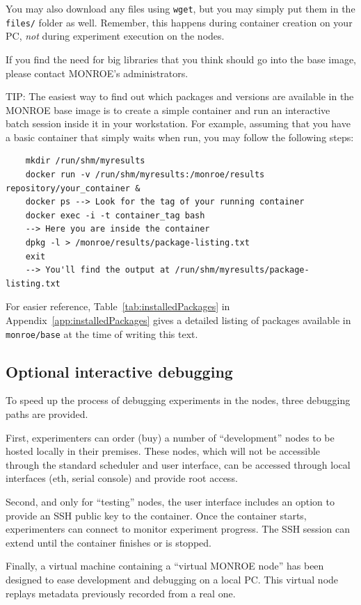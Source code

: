 \documentclass[a4paper,10pt]{article}
\newcommand{\VerbatimFont}{\footnotesize}
\newcommand{\monroe}{MONROE}
\newcommand{\identifier}[1]{{\texttt{\small{#1}}}}
\begin{document}
You may also download any files using \identifier{wget}, but you may simply put them in the \identifier{files/} folder as well.
Remember, this happens during container creation on your PC, \emph{not} during experiment execution on the nodes.

If you find the need for big libraries that you think should go into the base image, please contact \monroe{}'s administrators.

TIP: The easiest way to find out which packages and versions are available in the \monroe{} base image is to create a simple container and run an interactive batch session inside it in your workstation.
For example, assuming that you have a basic container that simply waits when run, you may follow the following steps:
{\VerbatimFont\begin{verbatim}
	mkdir /run/shm/myresults
	docker run -v /run/shm/myresults:/monroe/results repository/your_container &
	docker ps --> Look for the tag of your running container
	docker exec -i -t container_tag bash
	--> Here you are inside the container
	dpkg -l > /monroe/results/package-listing.txt
	exit
	--> You'll find the output at /run/shm/myresults/package-listing.txt
\end{verbatim}}
For easier reference, Table~\ref{tab:installedPackages} in Appendix~\ref{app:installedPackages} gives a detailed listing of packages available in \identifier{monroe/base} at the time of writing this text.

\subsection{Optional interactive debugging}
To speed up the process of debugging experiments in the nodes, three debugging paths are provided.

First, experimenters can order (buy) a number of ``development'' nodes to be hosted locally in their premises.
These nodes, which will not be accessible through the standard scheduler and user interface, can be accessed through local interfaces (eth, serial console) and provide root access.

Second, and only for ``testing'' nodes, the user interface includes an option to provide an SSH public key to the container.
Once the container starts, experimenters can connect to monitor experiment progress.
The SSH session can extend until the container finishes or is stopped.

Finally, a virtual machine containing a ``virtual \monroe{} node'' has been designed to ease development and debugging on a local PC.
This virtual node replays metadata previously recorded from a real one.
\end{document}
